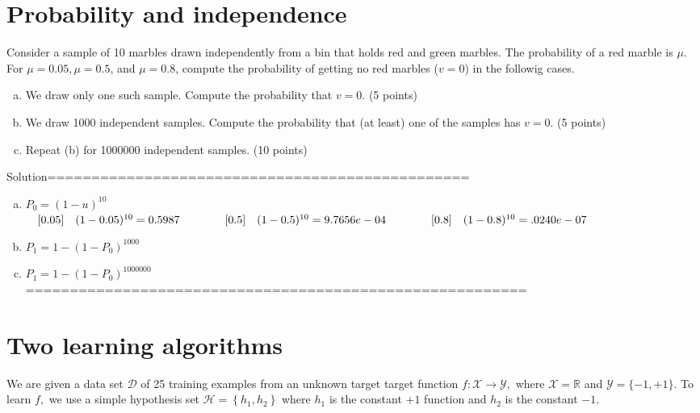 \documentclass[11pt, a4paper]{article}
\begin{document}
\section{Probability and independence}
Consider a sample of 10 marbles drawn independently from a bin that holds red and green marbles. The probability of a red marble is $\mu$. For $\mu= 0.05, \mu = 0.5$, and $\mu=0.8$, compute the probability of getting no red marbles ($v=0$) in the followig cases.
\begin{enumerate}[(a)]
	\item We draw only one such sample. Compute the probability that $v=0$. (5 points)
	\item We draw 1000 independent samples. Compute the probability that (at least) one of the samples has $v=0$. (5 points)
	\item Repeat (b) for 1000000 independent samples.  (10 points)
\end{enumerate}



Solution================================================
\begin{enumerate}[(a)]
	\item  $P_{0}=(1-u)^{10}$\\
	$ \quad [0.05]  \quad  (1-0.05)^{10} =0.5987\\
	 \qquad  \qquad [0.5] \quad(1-0.5)^{10}= 9.7656e-04\\
	  \qquad \qquad  [0.8]\quad (1-0.8)^{10}=.0240e-07$\\
	  \item $P_{1}=1-(1-P_{0})^{1000} $\\
	   \item $P_{1}=1-(1-P_{0})^{1000000} $\\
	=========================================================
	\end{enumerate}




\section{Two learning algorithms}
We are given a data set $\mathcal{D}$ of 25 training examples from an unknown target target
function $f : \mathcal{X} \rightarrow \mathcal{Y},$ where $\mathcal{X}=\mathbb{R}$ and $\mathcal{Y}=\{-1,+1\} .$ To learn $f,$ we use
a simple hypothesis set $\mathcal{H}=\left\{h_{1}, h_{2}\right\}$ where $h_{1}$ is the constant $+1$ function
and $h_{2}$ is the constant $-1$.
\end{document}
